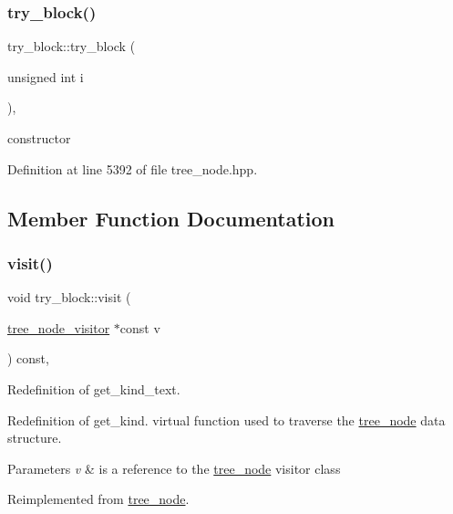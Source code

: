 \subsubsection{\texorpdfstring{try\+\_\+block()}{try\_block()}}
{\footnotesize\ttfamily try\+\_\+block\+::try\+\_\+block (\begin{DoxyParamCaption}\item[{unsigned int}]{i }\end{DoxyParamCaption})\hspace{0.3cm}{\ttfamily [inline]}, {\ttfamily [explicit]}}



constructor 



Definition at line 5392 of file tree\+\_\+node.\+hpp.



\subsection{Member Function Documentation}
\mbox{\label{structtry__block_aedc2ad7c024dea066c6d6d18f13dd736}} 
\subsubsection{\texorpdfstring{visit()}{visit()}}
{\footnotesize\ttfamily void try\+\_\+block\+::visit (\begin{DoxyParamCaption}\item[{\hyperlink{classtree__node__visitor}{tree\+\_\+node\+\_\+visitor} $\ast$const}]{v }\end{DoxyParamCaption}) const\hspace{0.3cm}{\ttfamily [override]}, {\ttfamily [virtual]}}



Redefinition of get\+\_\+kind\+\_\+text. 

Redefinition of get\+\_\+kind. virtual function used to traverse the \hyperlink{classtree__node}{tree\+\_\+node} data structure. 
\begin{DoxyParams}{Parameters}
{\em v} & is a reference to the \hyperlink{classtree__node}{tree\+\_\+node} visitor class \\
\hline
\end{DoxyParams}


Reimplemented from \hyperlink{classtree__node_aa9abba3f1b30e0be80b4a56b188c6ecc}{tree\+\_\+node}.



